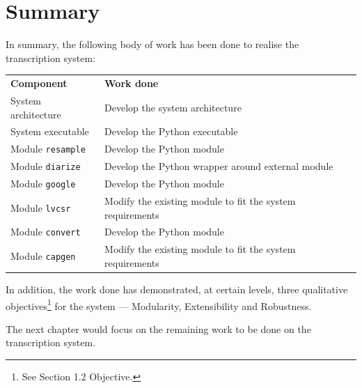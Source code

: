 \section{Summary}

In summary, the following body of work has been done to realise the transcription
system:

\begin{table}[h]
\begin{tabularx}{\textwidth}{ll}
    \textbf{Component} & \textbf{Work done} \\
    System architecture & Develop the system architecture \\
    System executable & Develop the Python executable \\
    Module \texttt{resample} & Develop the Python module \\ 
    Module \texttt{diarize} & Develop the Python wrapper
    around external module \\
    Module \texttt{google} & Develop the Python module \\
    Module \texttt{lvcsr} & Modify the existing module to
    fit the system requirements \\
    Module \texttt{convert} & Develop the Python module \\
    Module \texttt{capgen} & Modify the existing module to
    fit the system requirements \\
\end{tabularx}
\end{table}

In addition, the work done has demonstrated, at certain levels, three qualitative
objectives\footnote{See Section 1.2 Objective.} for the system --- Modularity,
Extensibility and Robustness.

The next chapter would focus on the remaining work to be done on the transcription
system.
